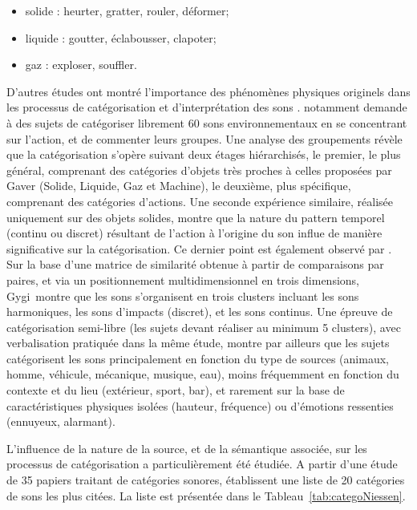 {\begin{itemize}
\item solide : heurter, gratter, rouler, déformer;
\item liquide : goutter, éclabousser, clapoter;
\item gaz : exploser, souffler.
\end{itemize} 

D'autres études ont montré l'importance des phénomènes physiques originels dans les processus de catégorisation et d'interprétation des sons \citep{marcell2000confrontation,lemaitre2010listener}. \citep{houix_lexical_2012} notamment demande à des sujets de catégoriser librement 60 sons environnementaux en se concentrant sur l'action, et de commenter leurs groupes. Une analyse des groupements révèle que la catégorisation s'opère suivant deux étages hiérarchisés, le premier, le plus général, comprenant des catégories d'objets très proches à celles proposées par Gaver (Solide, Liquide, Gaz et Machine), le deuxième, plus spécifique, comprenant des catégories d'actions. Une seconde expérience similaire, réalisée uniquement sur des objets solides, montre que la nature du pattern temporel (continu ou discret) résultant de l'action à l'origine du son influe de manière significative sur la catégorisation. Ce dernier point est également observé par \citep{gygi2007similarity}. Sur la base d'une matrice de similarité obtenue à partir de comparaisons par paires, et via un positionnement multidimensionnel en trois dimensions, Gygi~\al montre que les sons s'organisent en trois clusters incluant les sons harmoniques, les sons d'impacts (discret), et les sons continus. Une épreuve de catégorisation semi-libre (les sujets devant réaliser au minimum 5 clusters), avec verbalisation pratiquée dans la même étude, montre par ailleurs que les sujets catégorisent les sons principalement en fonction du type de sources (animaux, homme, véhicule, mécanique, musique, eau), moins fréquemment en fonction du contexte et du lieu (extérieur, sport, bar), et rarement sur la base de caractéristiques physiques isolées (hauteur, fréquence) ou d'émotions ressenties (ennuyeux, alarmant).

L'influence de la nature de la source, et de la sémantique associée, sur les processus de catégorisation a particulièrement été étudiée. A partir d'une étude de 35 papiers traitant de catégories sonores, \citep{niessen2010categories} établissent une liste de 20 catégories de sons les plus citées. La liste est présentée dans le Tableau~\ref{tab:categoNiessen}.

}
